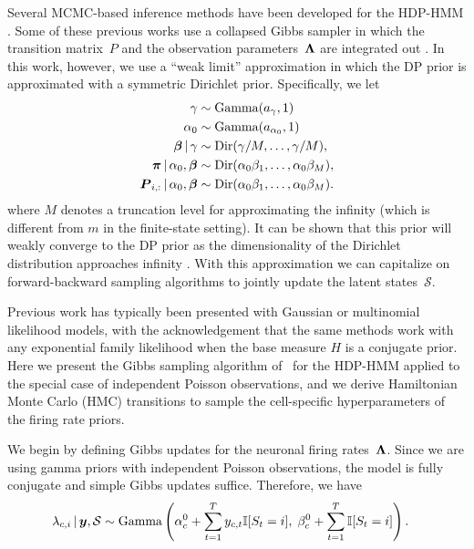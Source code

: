 Several MCMC-based inference methods have been developed for the HDP-HMM \citep{Beal02,Teh06,van08}. Some of these previous works use a collapsed Gibbs sampler in which the transition matrix~$P$ and the observation parameters~$\boldsymbol{\Lambda}$ are integrated out \citep{Teh06,van08}. In this work, however, we use a ``weak limit'' approximation in which the DP prior is approximated with a symmetric Dirichlet prior. Specifically, we let
\begin{align}
\label{eq:hdphmm_trans}
\gamma &\sim \mathrm{Gamma}(a_\gamma, 1) \\
\nonumber \alpha_0 &\sim \mathrm{Gamma}(a_{\alpha_0}, 1) \\
\nonumber \boldsymbol{\beta} \,|\, \gamma &\sim \mathrm{Dir}(\gamma/M, \ldots, \gamma/M), \\
\nonumber \boldsymbol{\pi} \,|\, \alpha_0, \boldsymbol{\beta} &\sim \mathrm{Dir}(\alpha_0 \beta_1, \ldots, \alpha_0 \beta_M), \\
\nonumber \boldsymbol{P}_{i,:} \,|\, \alpha_0, \boldsymbol{\beta} &\sim \mathrm{Dir}(\alpha_0 \beta_1, \ldots, \alpha_0 \beta_M).
\end{align}
where $M$ denotes a truncation level for approximating the infinity (which is different from  $m$ in the finite-state setting).
 It can be shown that this prior will weakly converge to the DP prior as the dimensionality of the Dirichlet distribution approaches infinity \citep{Johnson14, Ishwaran02}. With this approximation we can capitalize on forward-backward sampling algorithms to jointly update the latent states~$\mathcal{S}$.  

Previous work has typically been presented with Gaussian or multinomial likelihood models, with the acknowledgement that the same methods work with any exponential family likelihood  when the base measure $H$ is a conjugate prior.
Here we present the Gibbs sampling algorithm of~\citep{Teh06} for the HDP-HMM applied to the special case of independent Poisson observations, and we derive Hamiltonian Monte Carlo (HMC) transitions to sample the cell-specific hyperparameters of the firing rate priors. 

We begin by defining Gibbs updates for the neuronal firing rates~$\boldsymbol{\Lambda}$. Since we are using gamma priors with independent Poisson observations, the model is fully conjugate and simple Gibbs updates suffice. Therefore, we have
\begin{align}
\lambda_{c,i} \,|\, \boldsymbol{y}, \mathcal{S} &\sim \mathrm{Gamma}\left(\alpha_c^0 + \sum_{t=1}^T y_{c,t} \mathbb{I}[S_t=i], \;\beta_c^0 + \sum_{t=1}^T \mathbb{I}[S_t=i]\right).
\end{align}

